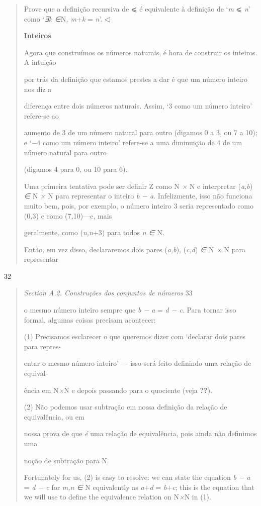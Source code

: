 \documentclass[
]{article}
\begin{document}
\begin{quote}
Prove que a definição recursiva de ⩽ é equivalente à definição de
`\emph{m} ⩽ \emph{n}' como `\emph{∃k ∈}N\emph{, m}+\emph{k} = \emph{n}'.
◁

\textbf{Inteiros}

Agora que construímos os números naturais, é hora de construir os
inteiros. A intuição

por trás da definição que estamos prestes a dar é que um número inteiro
nos diz a

diferença entre dois números naturais. Assim, `3 como um número inteiro'
refere-se ao

aumento de 3 de um número natural para outro (digamos 0 a 3, ou 7 a 10);
e `\emph{−}4 como um número inteiro' refere-se a uma diminuição de 4 de
um número natural para outro

(digamos 4 para 0, ou 10 para 6).

Uma primeira tentativa pode ser definir Z como N \emph{×} N e
interpretar (\emph{a,b}) \emph{∈} N \emph{×} N para representar o
inteiro \emph{b − a}. Infelizmente, isso não funciona muito bem, pois,
por exemplo, o número inteiro 3 seria representado como (0\emph{,}3) e
como (7\emph{,}10)---e, mais

geralmente, como (\emph{n,n}+3) para todos \emph{n ∈} N.

Então, em vez disso, declararemos dois pares (\emph{a,b}), (\emph{c,d})
\emph{∈} N \emph{×} N para representar
\end{quote}

32

\begin{quote}
\emph{Section A.2. Construções dos conjuntos de números} 33

o mesmo número inteiro sempre que \emph{b − a} = \emph{d − c}. Para
tornar isso formal, algumas coisas precisam acontecer:

(1) Precisamos esclarecer o que queremos dizer com `declarar dois pares
para repres-

entar o mesmo número inteiro' --- isso será feito definindo uma relação
de equival-

ência em N\emph{×}N e depois passando para o quociente (veja
\textbf{??}).

(2) Não podemos usar subtração em nossa definição da relação de
equivalência, ou em

nossa prova de que \emph{é} uma relação de equivalência, pois ainda não
definimos uma

noção de subtração para N.

Fortunately for us, (2) is easy to resolve: we can state the equation
\emph{b − a} = \emph{d − c} for \emph{m,n ∈} N equivalently as
\emph{a}+\emph{d} = \emph{b}+\emph{c}; this is the equation that we will
use to define the equivalence relation on N\emph{×}N in (1).
\end{quote}
\end{document}
